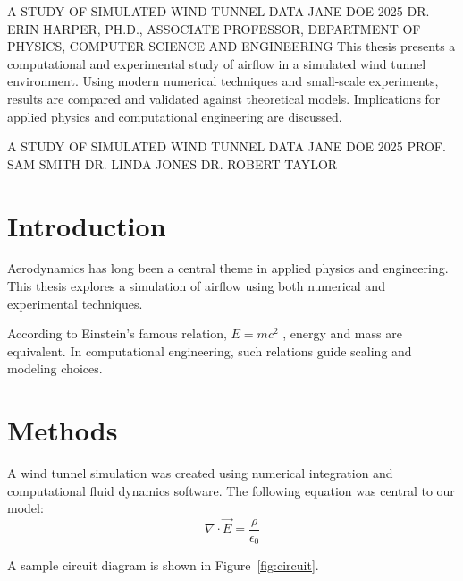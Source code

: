 \documentclass[12pt,oneside]{report}
\begin{document}
\apcsabstract
{A STUDY OF SIMULATED WIND TUNNEL DATA}
{JANE DOE}
{2025}
{DR. ERIN HARPER, PH.D., ASSOCIATE PROFESSOR, DEPARTMENT OF PHYSICS, COMPUTER SCIENCE AND ENGINEERING}
{This thesis presents a computational and experimental study of airflow in a simulated wind tunnel environment. Using modern numerical techniques and small-scale experiments, results are compared and validated against theoretical models. Implications for applied physics and computational engineering are discussed.}

\thesistitlepage
{A STUDY OF SIMULATED WIND TUNNEL DATA}
{JANE DOE}
{2025}
{PROF. SAM SMITH}
{DR. LINDA JONES}
{DR. ROBERT TAYLOR}

\frontmatter
\dedication{To my family and mentors, for their unwavering support.}

\tableofcontents
\listoftables
\listoffigures

\mainmatter

\chapter{Introduction}
Aerodynamics has long been a central theme in applied physics and engineering. This thesis explores a simulation of airflow using both numerical and experimental techniques.

According to Einstein's famous relation, $E = mc^2$ \cite{einstein1905}, energy and mass are equivalent. In computational engineering, such relations guide scaling and modeling choices.

\chapter{Methods}
A wind tunnel simulation was created using numerical integration and computational fluid dynamics software. The following equation was central to our model:
\begin{equation}
\nabla \cdot \vec{E} = \frac{\rho}{\epsilon_0}
\end{equation}

A sample circuit diagram is shown in Figure~\ref{fig:circuit}.

\end{document}
